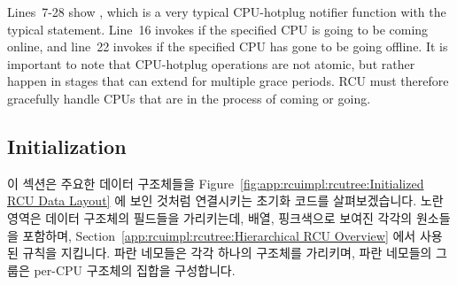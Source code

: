 Lines~7-28 show , which is a very typical
CPU-hotplug notifier function with the typical  statement.
Line~16 invokes  if the specified CPU is going
to be coming online, and line~22 invokes  if
the specified CPU has gone to be going offline.
It is important to note that CPU-hotplug operations are not atomic,
but rather happen in stages that can extend for multiple grace periods.
RCU must therefore gracefully handle CPUs that are in the process
of coming or going.
\fi

\subsection{Initialization}
\label{app:rcuimpl:rcutreewt:Initialization}

\begin{figure*}[tb]
\centering
{}
\caption{Initialized RCU Data Layout}
\label{fig:app:rcuimpl:rcutree:Initialized RCU Data Layout}
\end{figure*}

이 섹션은 주요한 데이터 구조체들을
Figure~\ref{fig:app:rcuimpl:rcutree:Initialized RCU Data Layout} 에 보인 것처럼
연결시키는 초기화 코드를 살펴보겠습니다.
노란 영역은  데이터 구조체의 필드들을 가리키는데, 
배열, 핑크색으로 보여진 각각의 원소들을 포함하며,
Section~\ref{app:rcuimpl:rcutree:Hierarchical RCU Overview} 에서 사용된 규칙을
지킵니다.
파란 네모들은 각각 하나의  구조체를 가리키며, 파란 네모들의 그룹은
per-CPU  구조체의 집합을 구성합니다.
\iffalse

This section walks through the initialization code, which links the
main data structures together as shown in
Figure~\ref{fig:app:rcuimpl:rcutree:Initialized RCU Data Layout}.
The yellow region represents fields in the \co{rcu_state} data
structure, including the \co{->node} array, individual elements
of which are shown in pink, matching the convention used in
Section~\ref{app:rcuimpl:rcutree:Hierarchical RCU Overview}.
The blue boxes each represent one \co{rcu_data} structure,
and the group of blue boxes makes up a set of per-CPU \co{rcu_data}
structures.
\fi

